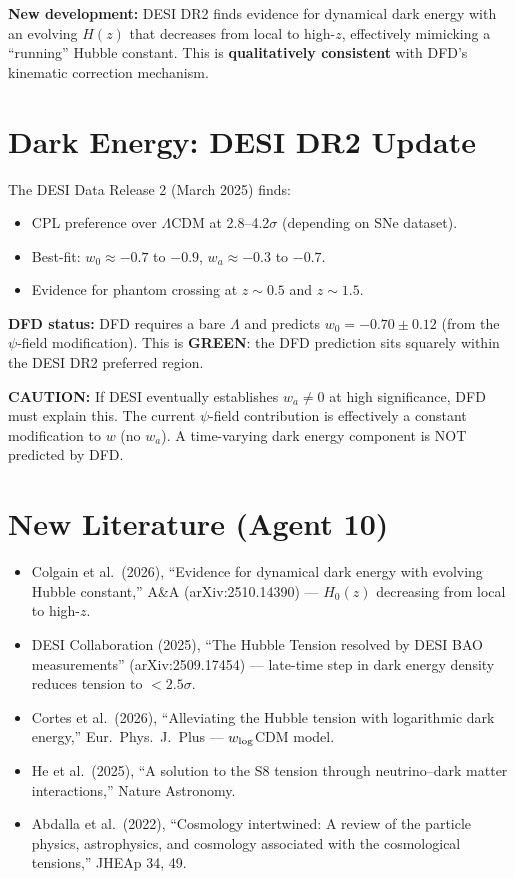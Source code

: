\documentclass[11pt,a4paper]{article}
\newcommand{\GREEN}{\textcolor{dfdgreen}{\textbf{GREEN}}}
\begin{document}
\textbf{New development:} DESI DR2 finds evidence for dynamical dark energy with an evolving $H(z)$ that decreases from local to high-$z$, effectively mimicking a ``running'' Hubble constant. This is \textbf{qualitatively consistent} with DFD's kinematic correction mechanism.

\section{Dark Energy: DESI DR2 Update}

The DESI Data Release 2 (March 2025) finds:
\begin{itemize}
\item CPL preference over $\Lambda$CDM at 2.8--4.2$\sigma$ (depending on SNe dataset).
\item Best-fit: $w_0 \approx -0.7$ to $-0.9$, $w_a \approx -0.3$ to $-0.7$.
\item Evidence for phantom crossing at $z \sim 0.5$ and $z \sim 1.5$.
\end{itemize}

\textbf{DFD status:} DFD requires a bare $\Lambda$ and predicts $w_0 = -0.70 \pm 0.12$ (from the $\psi$-field modification). This is \GREEN{}: the DFD prediction sits squarely within the DESI DR2 preferred region.

\textbf{CAUTION:} If DESI eventually establishes $w_a \neq 0$ at high significance, DFD must explain this. The current $\psi$-field contribution is effectively a constant modification to $w$ (no $w_a$). A time-varying dark energy component is NOT predicted by DFD.

\section{New Literature (Agent 10)}

\begin{itemize}
\item Colgain et al.\ (2026), ``Evidence for dynamical dark energy with evolving Hubble constant,'' A\&A (arXiv:2510.14390) --- $H_0(z)$ decreasing from local to high-$z$.
\item DESI Collaboration (2025), ``The Hubble Tension resolved by DESI BAO measurements'' (arXiv:2509.17454) --- late-time step in dark energy density reduces tension to $< 2.5\sigma$.
\item Cortes et al.\ (2026), ``Alleviating the Hubble tension with logarithmic dark energy,'' Eur.\ Phys.\ J.\ Plus --- $w_{\rm log}$CDM model.
\item He et al.\ (2025), ``A solution to the S8 tension through neutrino--dark matter interactions,'' Nature Astronomy.
\item Abdalla et al.\ (2022), ``Cosmology intertwined: A review of the particle physics, astrophysics, and cosmology associated with the cosmological tensions,'' JHEAp 34, 49.
\end{itemize}
\end{document}
